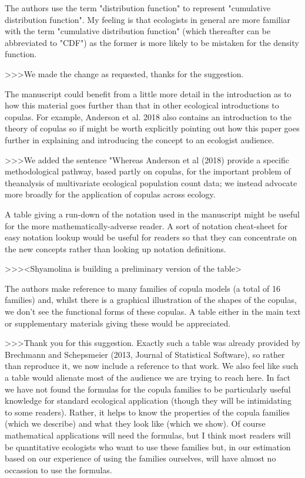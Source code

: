 The authors use the term "distribution function" to represent "cumulative distribution 
function".  My feeling is that ecologists in general are more familiar with the term 
"cumulative distribution function" (which thereafter can be abbreviated to "CDF") as the 
former is more likely to be mistaken for the density function.

>>>We made the change as requested, thanks for the suggestion.

The manuscript could benefit from a little more detail in the introduction as to how 
this material goes further than that in other ecological introductions to copulas.  
For example, Anderson et al. 2018 also contains an introduction to the theory of copulas 
so if might be worth explicitly pointing out how this paper goes further in explaining 
and introducing the concept to an ecologist audience.

>>>We added the sentence "Whereas Anderson et al (2018) provide a specific methodological 
pathway, based partly on copulas, for the important problem of theanalysis of multivariate 
ecological population count data; we instead advocate more broadly for the application of 
copulas across ecology.

A table giving a run-down of the notation used in the manuscript might be useful for the 
more mathematically-adverse reader.  A sort of notation cheat-sheet for easy notation 
lookup would be useful for readers so that they can concentrate on the new concepts rather 
than looking up notation definitions.

>>><Shyamolina is building a preliminary version of the table>

The authors make reference to many families of copula models (a total of 16 families) and, 
whilst there is a graphical illustration of the shapes of the copulas, we don't see the 
functional forms of these copulas.  A table either in the main text or supplementary materials 
giving these would be appreciated.
 
>>>Thank you for this suggestion. Exactly such a table was already provided by Brechmann 
and Schepsmeier (2013, Journal of Statistical Software), so rather than reproduce it, we
now include a reference to that work. We also feel like such a table would alienate most
of the audience we are trying to reach here. In fact we have not found the formulas
for the copula families to be particularly useful knowledge for standard ecological 
application (though they will be intimidating to some readers). Rather, it helps to 
know the properties of the copula families (which we describe) and what they look 
like (which we show). Of course mathematical applications will need the formulas, but 
I think most readers will be quantitative ecologists who want to use these families 
but, in our estimation based on our experience of using the families ourselves, will 
have almost no occassion to use the formulas.
